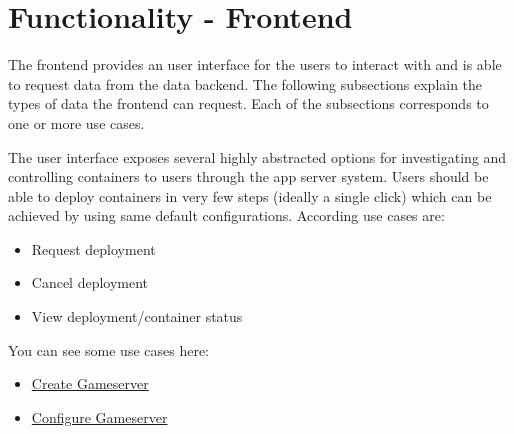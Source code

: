 \documentclass[a4paper,12pt,chapterprefix=false,bibliography=totoc,listof=totoc,]{scrreprt}
\begin{document}
\section{Functionality - Frontend}


The frontend provides an user interface for the users to interact with and is able to request data from the data backend. The following subsections explain the types of data the frontend can request. Each of the subsections corresponds to one or more use cases.

The user interface exposes several highly abstracted options for investigating and controlling containers to users through the app server system. Users should be able to deploy containers in very few steps (ideally a single click) which can be achieved by using same default configurations. According use cases are:

\begin{itemize}
    \item Request deployment
    \item Cancel deployment
    \item View deployment/container status
\end{itemize}

You can see some use cases here:
\begin{itemize}
	\item \href{https://gamebase.pages.gitlab.tandashi.de/documentation/UCCreateGameServer.pdf}{Create Gameserver}
	\item \href{https://gamebase.pages.gitlab.tandashi.de/documentation/UCConfigureGameServer.pdf}{Configure Gameserver}
\end{itemize}
\end{document}
